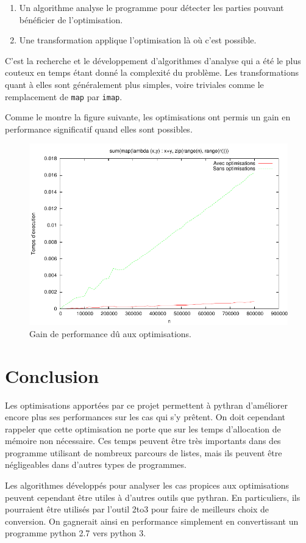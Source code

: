 \documentclass[a4paper]{article}
\begin{document}
\begin{enumerate}
\item Un algorithme analyse le programme pour détecter les parties
  pouvant bénéficier de l'optimisation.
\item Une transformation applique l'optimisation là où c'est possible.
\end{enumerate}

C'est la recherche et le développement d'algorithmes d'analyse qui a
été le plus couteux en temps étant donné la complexité du
problème. Les transformations quant à elles sont généralement plus
simples, voire triviales comme le remplacement de \texttt{map} par
\texttt{imap}.

Comme le montre la figure suivante, les optimisations ont permis un
gain en performance significatif quand elles sont possibles.

\begin{figure}[h]
  \includegraphics[width=\textwidth]{perf_optimization}
  \caption{Gain de performance dû aux optimisations.}
\end{figure}


\section*{Conclusion}

Les optimisations apportées par ce projet permettent à pythran
d'améliorer encore plus ses performances sur les cas qui s'y
prêtent. On doit cependant rappeler que cette optimisation ne porte
que sur les temps d'allocation de mémoire non nécessaire. Ces temps
peuvent être très importants dans des programme utilisant de nombreux
parcours de listes, mais ils peuvent être négligeables dans d'autres
types de programmes.

Les algorithmes développés pour analyser les cas propices aux
optimisations peuvent cependant être utiles à d'autres outils que
pythran. En particuliers, ils pourraient être utilisés par l'outil
2to3 pour faire de meilleurs choix de conversion. On gagnerait ainsi
en performance simplement en convertissant un programme python 2.7
vers python 3.
\end{document}
